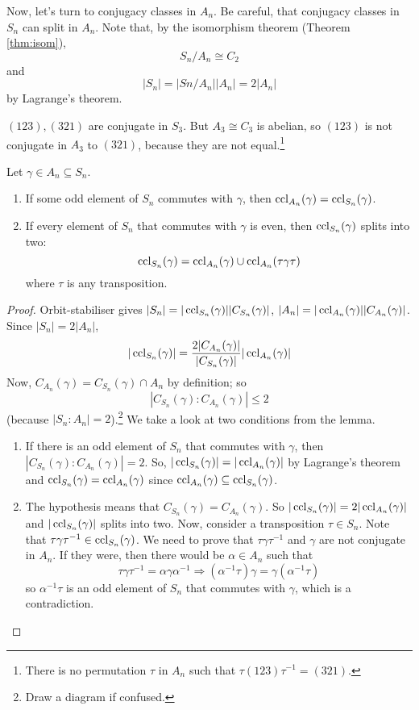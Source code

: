 \documentclass[10pt, a4paper, twoside]{report}
\begin{document}
Now, let's turn to conjugacy classes in \(A_n\). Be careful, that conjugacy classes in \(S_n\) can split in \(A_n\). Note that, by the isomorphism theorem (Theorem \ref{thm:isom}), 
\[S_n/A_n\cong C_2\]
and 
\[|S_n|=|Sn/A_n||A_n|=2|A_n|\]
by Lagrange's theorem.
\begin{example}
    \((123),(321)\) are conjugate in \(S_3\). But \(A_3\cong C_3\) is abelian, so \((123)\) is not conjugate in \(A_3\) to \((321)\), because they are not equal.\footnote{There is no permutation \(\tau\) in \(A_n\) such that \(\tau(123)\tau^{-1}=(321)\).}
\end{example}
\begin{lemma}
    Let \(\gamma\in A_n\subseteq S_n\).
    \begin{enumerate}
        \item If some odd element of \(S_n\) commutes with \(\gamma\), then \(\operatorname{ccl}_{A_n}(\gamma)=\operatorname{ccl}_{S_n}(\gamma)\).
        \item If every element of \(S_n\) that commutes with \(\gamma\) is even, then \(\operatorname{ccl}_{S_n}(\gamma)\) splits into two:
        \[\operatorname{ccl}_{S_n}(\gamma)=\operatorname{ccl}_{A_n}(\gamma)\cup\operatorname{ccl}_{A_n}(\tau\gamma\tau)\]
        where \(\tau\) is any transposition.
    \end{enumerate}
\end{lemma}
\begin{proof}
    Orbit-stabiliser gives \(|S_n|=|\operatorname{ccl}_{S_n}(\gamma)||C_{S_n}(\gamma)|\), \(|A_n|=|\operatorname{ccl}_{A_n}(\gamma)||C_{A_n}(\gamma)|\). \\ Since \(|S_n|=2|A_n|\), 
    \[|\operatorname{ccl}_{S_n}(\gamma)|=\frac{2|C_{A_n}(\gamma)|}{|C_{S_n}(\gamma)|}|\operatorname{ccl}_{A_n}(\gamma)|\]
    Now, \(C_{A_n}(\gamma)=C_{S_n}(\gamma)\cap A_n\) by definition; so 
    \[|C_{S_n}(\gamma):C_{A_n}(\gamma)|\leq 2\]
    (because \(|S_n:A_n|=2\)).\footnote{Draw a diagram if confused.}
    We take a look at two conditions from the lemma.
    \begin{enumerate}
        \item If there is an odd element of \(S_n\) that commutes with \(\gamma\), then \(|C_{S_n}(\gamma):C_{A_n}(\gamma)|=2\). So, \(|\operatorname{ccl}_{S_n}(\gamma)|=|\operatorname{ccl}_{A_n}(\gamma)|\) by Lagrange's theorem and \(\operatorname{ccl}_{S_n}(\gamma)=\operatorname{ccl}_{A_n}(\gamma)\) since \(\operatorname{ccl}_{A_n}(\gamma)\subseteq\operatorname{ccl}_{S_n}(\gamma)\).
        \item The hypothesis means that \(C_{S_n}(\gamma)=C_{A_n}(\gamma)\). So \(|\operatorname{ccl}_{S_n}(\gamma)|=2|\operatorname{ccl}_{A_n}(\gamma)|\) and \(|\operatorname{ccl}_{S_n}(\gamma)|\) splits into two. Now, consider a transposition \(\tau\in S_n\). Note that \(\tau\gamma\tau^{-1}\in\operatorname{ccl}_{S_n}(\gamma)\). We need to prove that \(\tau\gamma\tau^{-1}\) and \(\gamma\) are not conjugate in \(A_n\). If they were, then there would be \(\alpha\in A_n\) such that 
        \[\tau\gamma\tau^{-1}=\alpha\gamma\alpha^{-1}\Rightarrow(\alpha^{-1}\tau)\gamma=\gamma(\alpha^{-1}\tau)\]
        so \(\alpha^{-1}\tau\) is an odd element of \(S_n\) that commutes with \(\gamma\), which is a contradiction.
    \end{enumerate}
\end{proof}
\end{document}
